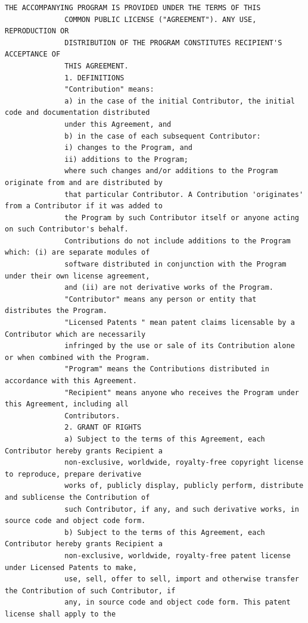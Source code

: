 \begin{lstlisting}[basicstyle=\ttfamily\scriptsize,breaklines=true]
THE ACCOMPANYING PROGRAM IS PROVIDED UNDER THE TERMS OF THIS
              COMMON PUBLIC LICENSE ("AGREEMENT"). ANY USE, REPRODUCTION OR
              DISTRIBUTION OF THE PROGRAM CONSTITUTES RECIPIENT'S ACCEPTANCE OF
              THIS AGREEMENT.
              1. DEFINITIONS
              "Contribution" means:
              a) in the case of the initial Contributor, the initial code and documentation distributed
              under this Agreement, and
              b) in the case of each subsequent Contributor:
              i) changes to the Program, and
              ii) additions to the Program;
              where such changes and/or additions to the Program originate from and are distributed by
              that particular Contributor. A Contribution 'originates' from a Contributor if it was added to
              the Program by such Contributor itself or anyone acting on such Contributor's behalf.
              Contributions do not include additions to the Program which: (i) are separate modules of
              software distributed in conjunction with the Program under their own license agreement,
              and (ii) are not derivative works of the Program.
              "Contributor" means any person or entity that distributes the Program.
              "Licensed Patents " mean patent claims licensable by a Contributor which are necessarily
              infringed by the use or sale of its Contribution alone or when combined with the Program.
              "Program" means the Contributions distributed in accordance with this Agreement.
              "Recipient" means anyone who receives the Program under this Agreement, including all
              Contributors.
              2. GRANT OF RIGHTS
              a) Subject to the terms of this Agreement, each Contributor hereby grants Recipient a
              non-exclusive, worldwide, royalty-free copyright license to reproduce, prepare derivative
              works of, publicly display, publicly perform, distribute and sublicense the Contribution of
              such Contributor, if any, and such derivative works, in source code and object code form.
              b) Subject to the terms of this Agreement, each Contributor hereby grants Recipient a
              non-exclusive, worldwide, royalty-free patent license under Licensed Patents to make,
              use, sell, offer to sell, import and otherwise transfer the Contribution of such Contributor, if
              any, in source code and object code form. This patent license shall apply to the

\end{lstlisting}
